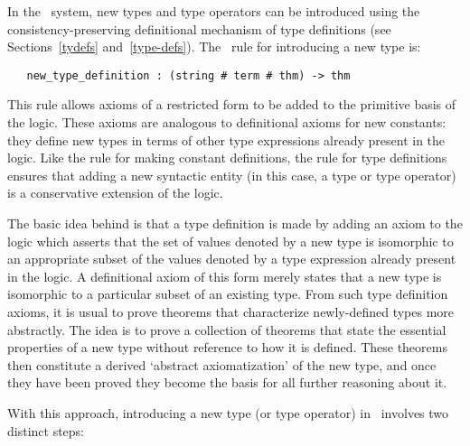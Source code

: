 In the \HOL\ system, new types and type operators can be
introduced
using the consistency-preserving definitional mechanism of type
definitions (see Sections~\ref{tydefs}
and~\ref{type-defs}).  The \ML\ rule for introducing a new type is:

\begin{hol}
\begin{verbatim}
   new_type_definition : (string # term # thm) -> thm
\end{verbatim}\end{hol}

\noindent This rule allows
axioms of a restricted form to be added to the primitive basis of the logic.
These axioms are analogous to definitional axioms for new constants: they
define new types in terms of other type expressions already present in the
logic. Like the rule  for making constant definitions,
the rule  
 for type definitions
ensures that adding a new syntactic entity (in this case, a type or
type operator) is a conservative extension of the logic.

The basic idea behind  is  that a  type definition is
made by  adding an  axiom to  the logic  which asserts  that the  set of values
denoted by a  new type  is isomorphic  to an  appropriate subset  of the values
denoted by  a type  expression already  present in  the logic.   A definitional
axiom of this form merely states
that a  new type  is isomorphic  to a particular
subset of an existing type.  From such type definition  axioms, it  is usual to
prove theorems that characterize newly-defined types more abstractly.  The idea
is to prove a collection of theorems that state  the essential  properties of a
new type without reference to how it is defined.   These  theorems then
constitute a derived `abstract axiomatization' of the new type, and
once  they have  been proved they
become the basis for all further reasoning about it.

With this approach, introducing a new type (or type operator) in \HOL\
involves two distinct steps:

